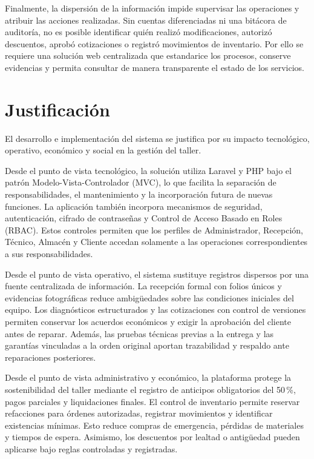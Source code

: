 Finalmente, la dispersión de la información impide supervisar las operaciones y atribuir las acciones realizadas. Sin cuentas diferenciadas ni una bitácora de auditoría, no es posible identificar quién realizó modificaciones, autorizó descuentos, aprobó cotizaciones o registró movimientos de inventario. Por ello se requiere una solución web centralizada que estandarice los procesos, conserve evidencias y permita consultar de manera transparente el estado de los servicios.

\section{Justificación}

El desarrollo e implementación del sistema se justifica por su impacto tecnológico, operativo, económico y social en la gestión del taller.

Desde el punto de vista tecnológico, la solución utiliza Laravel y PHP bajo el patrón Modelo-Vista-Controlador (MVC), lo que facilita la separación de responsabilidades, el mantenimiento y la incorporación futura de nuevas funciones. La aplicación también incorpora mecanismos de seguridad, autenticación, cifrado de contraseñas y Control de Acceso Basado en Roles (RBAC). Estos controles permiten que los perfiles de Administrador, Recepción, Técnico, Almacén y Cliente accedan solamente a las operaciones correspondientes a sus responsabilidades.

Desde el punto de vista operativo, el sistema sustituye registros dispersos por una fuente centralizada de información. La recepción formal con folios únicos y evidencias fotográficas reduce ambigüedades sobre las condiciones iniciales del equipo. Los diagnósticos estructurados y las cotizaciones con control de versiones permiten conservar los acuerdos económicos y exigir la aprobación del cliente antes de reparar. Además, las pruebas técnicas previas a la entrega y las garantías vinculadas a la orden original aportan trazabilidad y respaldo ante reparaciones posteriores.

Desde el punto de vista administrativo y económico, la plataforma protege la sostenibilidad del taller mediante el registro de anticipos obligatorios del 50\,\%, pagos parciales y liquidaciones finales. El control de inventario permite reservar refacciones para órdenes autorizadas, registrar movimientos y identificar existencias mínimas. Esto reduce compras de emergencia, pérdidas de materiales y tiempos de espera. Asimismo, los descuentos por lealtad o antigüedad pueden aplicarse bajo reglas controladas y registradas.

